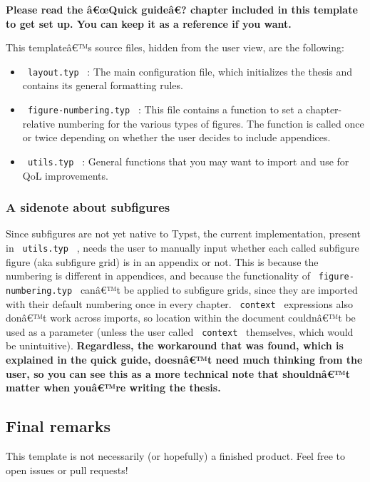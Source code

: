 \textbf{Please read the â€œQuick guideâ€? chapter included in this
template to get set up. You can keep it as a reference if you want.}

This templateâ€™s source files, hidden from the user view, are the
following:

\begin{itemize}
\item
  \texttt{\ layout.typ\ } : The main configuration file, which
  initializes the thesis and contains its general formatting rules.
\item
  \texttt{\ figure-numbering.typ\ } : This file contains a function to
  set a chapter-relative numbering for the various types of figures. The
  function is called once or twice depending on whether the user decides
  to include appendices.
\item
  \texttt{\ utils.typ\ } : General functions that you may want to import
  and use for QoL improvements.
\end{itemize}

\subsubsection{A sidenote about
subfigures}\label{a-sidenote-about-subfigures}

Since subfigures are not yet native to Typst, the current
implementation, present in \texttt{\ utils.typ\ } , needs the user to
manually input whether each called subfigure figure (aka subfigure grid)
is in an appendix or not. This is because the numbering is different in
appendices, and because the functionality of
\texttt{\ figure-numbering.typ\ } canâ€™t be applied to subfigure grids,
since they are imported with their default numbering once in every
chapter. \texttt{\ context\ } expressions also donâ€™t work across
imports, so location within the document couldnâ€™t be used as a
parameter (unless the user called \texttt{\ context\ } themselves, which
would be unintuitive). \textbf{Regardless, the workaround that was
found, which is explained in the quick guide, doesnâ€™t need much
thinking from the user, so you can see this as a more technical note
that shouldnâ€™t matter when youâ€™re writing the thesis.}

\subsection{Final remarks}\label{final-remarks}

This template is not necessarily (or hopefully) a finished product. Feel
free to open issues or pull requests!

